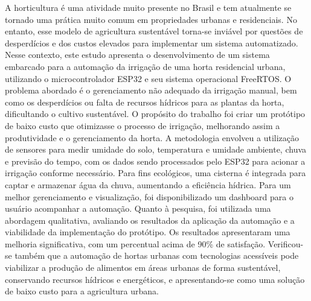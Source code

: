 \documentclass[%
  article,%
  a4paper,%
  12pt,%
  fleqn,%
  oneside,%
  chapter = TITLE,%
  section = TITLE,%
]{abntex2}
\affil{Bacharel Sistemas de Informação; UNOESC ; Chapecó}%
\affil{Especialista em Desenvolvimento de aplicações Web; UNOPAR; Chapecó}%
\begin{document}
\pretextual%

\begin{paginadetitulo}%

    \begin{ambienteresumo}%
A horticultura é uma atividade muito presente no Brasil e tem atualmente se tornado uma prática muito comum em propriedades urbanas e residenciais. No entanto, esse modelo de agricultura sustentável torna-se inviável por questões de desperdícios e dos custos elevados para implementar um sistema automatizado. Nesse contexto, este estudo apresenta o desenvolvimento de um sistema embarcado para a automação da irrigação de uma horta residencial urbana, utilizando o microcontrolador ESP32 e seu sistema operacional FreeRTOS. O problema abordado é o gerenciamento não adequado da irrigação manual, bem como os desperdícios ou falta de recursos hídricos para as plantas da horta, dificultando o cultivo sustentável. O propósito do trabalho foi criar um protótipo de baixo custo que otimizasse o processo de irrigação, melhorando assim a produtividade e o gerenciamento da horta. A metodologia envolveu a utilização de sensores para medir umidade do solo, temperatura e umidade ambiente, chuva e previsão do tempo, com os dados sendo processados pelo ESP32 para acionar a irrigação conforme necessário. Para fins ecológicos, uma cisterna é integrada para captar e armazenar água da chuva, aumentando a eficiência hídrica. Para um melhor gerenciamento e visualização, foi disponibilizado um dashboard para o usuário acompanhar a automação. Quanto à pesquisa, foi utilizada uma abordagem qualitativa, avaliando os resultados da aplicação da automação e a viabilidade da implementação do protótipo. Os resultados apresentaram uma melhoria significativa, com um percentual acima de 90\% de satisfação. Verificou-se também que a automação de hortas urbanas com tecnologias acessíveis pode viabilizar a produção de alimentos em áreas urbanas de forma sustentável, conservando recursos hídricos e energéticos, e apresentando-se como uma solução de baixo custo para a agricultura urbana.
    \end{ambienteresumo}
    

\end{paginadetitulo}
\end{document}
